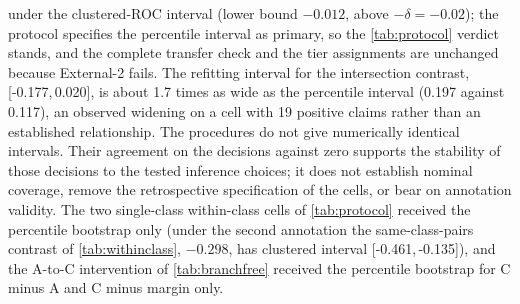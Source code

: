 \documentclass[11pt]{article}
\newcommand{\ci}[2]{[#1,\,#2]}
\begin{document}
under the clustered-ROC interval (lower bound $-0.012$, above $-\delta=-0.02$); the protocol
specifies the percentile interval as primary, so the \cref{tab:protocol} verdict stands, and the
complete transfer check and the tier assignments are unchanged because External-2 fails. The
refitting interval for the intersection contrast, \ci{-0.177}{0.020}, is about 1.7 times as wide
as the percentile interval (0.197 against 0.117), an observed widening on a cell with 19 positive
claims rather than an established relationship. The procedures do not give numerically identical
intervals. Their agreement on the decisions against zero supports the stability of those
decisions to the tested inference choices; it does not establish nominal coverage, remove the
retrospective specification of the cells, or bear on annotation validity. The two single-class
within-class cells of \cref{tab:protocol} received the percentile bootstrap only (under the second
annotation the same-class-pairs contrast of \cref{tab:withinclass}, $-0.298$, has clustered
interval \ci{-0.461}{-0.135}), and the A-to-C intervention of \cref{tab:branchfree} received the
percentile bootstrap for C minus A and C minus margin only.
\end{document}
